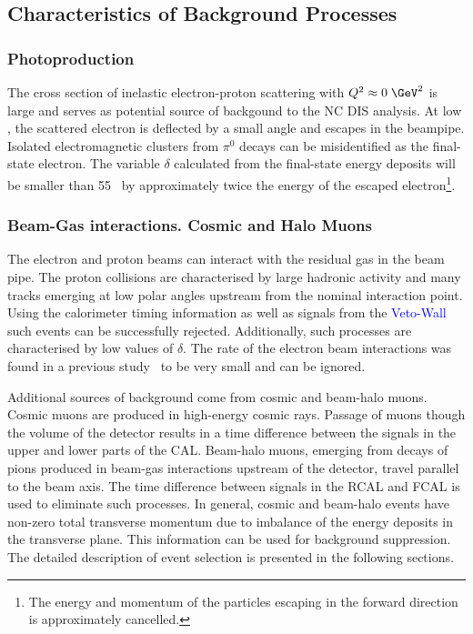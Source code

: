 \subsection{Characteristics of Background Processes}
\label{subsec:bgchar}

\subsubsection{Photoproduction}
\label{subsubsec:photoprodbg}
The cross section of inelastic electron-proton scattering with $\qsq \approx 0\;\GeV^2$ is large and serves as potential source of backgound to the NC DIS analysis. At low \qsq, the scattered electron is deflected by a small angle and escapes in the beampipe. Isolated electromagnetic clusters from $\pi^0$ decays can be misidentified as the final-state electron. The variable $\delta$ calculated from the final-state energy deposits will be smaller than 55 \GeV~by approximately twice the energy of the escaped electron\footnote{The energy and momentum of the particles escaping in the forward direction is approximately cancelled.}.

\subsubsection{Beam-Gas interactions. Cosmic and Halo Muons}
\label{subsubsec:beamgasfeatures}
The electron and proton beams can interact with the residual gas in the beam pipe. The proton collisions are characterised by large hadronic activity and many tracks emerging at low polar angles upstream from the nominal interaction point. Using the calorimeter timing information as well as signals from the \textcolor{blue}{Veto-Wall} such events can be successfully rejected. Additionally, such processes are characterised by low values of $\delta$. The rate of the electron beam interactions was found in a previous study~\cite{thesis:moritz:2001} to be very small and can be ignored.

Additional sources of background come from cosmic and beam-halo muons. Cosmic muons are produced in high-energy cosmic rays. Passage of muons though the volume of the detector results in a time difference between the signals in the upper and lower parts of the CAL. Beam-halo muons, emerging from decays of pions produced in beam-gas interactions upstream of the detector, travel parallel to the beam axis. The time difference between signals in the RCAL and FCAL is used to eliminate such processes. In general, cosmic and beam-halo events have non-zero total transverse momentum due to imbalance of the energy deposits in the transverse plane. This information can be used for background suppression. The detailed description of event selection is presented in the following sections.


